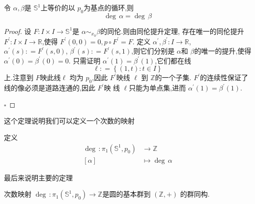 \documentclass[../../几何与拓扑.tex]{subfiles}
\begin{document}
\begin{theorem}
    令 \(   \alpha , \beta   \)是 \(  \mathbb{S}^{1}  \)上等价的以 \(  p_0  \)为基点的循环,则 \[
    \operatorname{deg}\,\alpha = \operatorname{deg}\,\beta 
    \]   
\end{theorem}

\begin{proof}
    设 \(  F: I \times I \to \mathbb{S}^{1}  \)是 \(  \alpha \sim _{x_0}\beta   \)的同伦.则由同伦提升定理,
    存在唯一的同伦提升 \(  F^{\prime} : I \times  I \to \mathbb{R}   \),使得 \(  F^{\prime} \left( 0,0 \right)= 0,p\circ F^{\prime}  = F   \).    
    定义 \(  \alpha ^{\prime} ,\beta ^{\prime} : I \to \mathbb{R}   \), \(  \alpha ^{\prime} \left( s \right): =  F^{\prime} \left( s,0 \right)    \), \(  \beta ^{\prime} \left( s \right): =  F^{\prime} \left( s,1 \right)    \),则它们分别是 \(  \alpha   \)和 \(  \beta   \)的唯一的提升,使得 
    \(  \alpha ^{\prime} \left( 0 \right)= \beta ^{\prime} \left( 0 \right)= 0    \).
    只需证明 \(  \alpha ^{\prime} \left( 1 \right)= \beta ^{\prime} \left( 1 \right)    \),它们都在线 \[
   \ell: =   \left\{ \left( 1,t \right): t \in I  \right\}
    \]上.注意到 \(  F  \)映此线\(   \ell  \) 均为 \(  p_0  \),因此 \(  F^{\prime}   \)映线 \(   \ell  \) 到 \(  \mathbb{Z}  \)的一个子集. \(  F^{\prime}   \)的连续性保证了线的像必须是道路连通的,因此 \(  F^{\prime}   \)映 线 \(  \ell  \)只能为单点集,进而 \(  \alpha ^{\prime} \left( 1 \right)= \beta ^{\prime} \left( 1 \right)     \).               

    \hfill $\square$
\end{proof}

这个定理说明我们可以定义一个次数的映射 
\begin{definition}
    定义 \[
    \begin{aligned}
    \operatorname{deg}\,:  \pi _1 \left( \mathbb{S}^{1}, p_0 \right) & \to \mathbb{Z} \\ 
     [\alpha ] & \mapsto \operatorname{deg}\,\alpha 
    \end{aligned}
    \]
\end{definition}

最后来说明主要的定理

\begin{definition}
    次数映射 \(  \operatorname{deg}\,: \pi _1 \left( \mathbb{S}^{1}, p_0 \right)\to \mathbb{Z}   \)是圆的基本群到 \(  \left( \mathbb{Z},+  \right)   \)  的群同构.
\end{definition}
\end{document}
